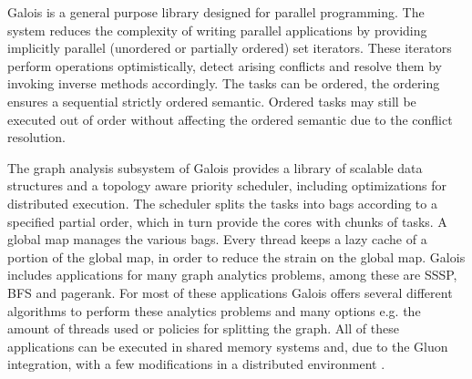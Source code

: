 Galois \cite{origGalois} is a general purpose library designed for parallel programming. The system reduces the complexity of writing parallel applications by providing implicitly parallel (unordered or partially ordered) set iterators. These iterators perform operations optimistically, detect arising conflicts and resolve them by invoking inverse methods accordingly. The tasks can be ordered, the ordering ensures a sequential strictly ordered semantic. Ordered tasks may still be executed out of order without affecting the ordered semantic due to the conflict resolution.


The graph analysis subsystem of Galois \cite{Galois} provides a library of scalable data structures and a topology aware priority scheduler, including optimizations for distributed execution. The scheduler splits the tasks into bags according to a specified partial order, which in turn provide the cores with chunks of tasks. A global map manages the various bags. Every thread keeps a lazy cache of a portion of the global map, in order to reduce the strain on the global map. Galois includes applications for many graph analytics problems, among these are SSSP, BFS and pagerank. For most of these applications Galois offers several different algorithms to perform these analytics problems and many options e.g. the amount of threads used or policies for splitting the graph. All of these applications can be executed in shared memory systems and, due to the Gluon integration, with a few modifications in a distributed environment \cite{vertGalois}.


